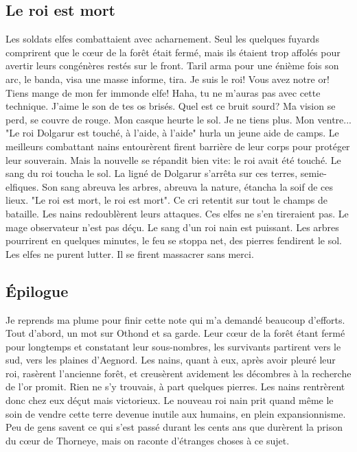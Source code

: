\subsection{Le roi est mort}
Les soldats elfes combattaient avec acharnement. Seul les quelques fuyards comprirent que le cœur de la forêt était fermé, mais ils étaient trop affolés pour avertir leurs congénères restés sur le front.
\newline
Taril arma pour une énième fois son arc, le banda, visa une masse informe, tira.
\newline
Je suis le roi! Vous avez notre or! Tiens mange de mon fer immonde elfe! Haha, tu ne m'auras pas avec cette technique. J'aime le son de tes os brisés. Quel est ce bruit sourd? Ma vision se perd, se couvre de rouge. Mon casque heurte le sol. Je ne tiens plus. Mon ventre...
\newline
"Le roi Dolgarur est touché, à l'aide, à l'aide" hurla un jeune aide de camps. Le meilleurs combattant nains entourèrent firent barrière de leur corps pour protéger leur souverain. Mais la nouvelle se répandit bien vite: le roi avait été touché.
\newline
Le sang du roi toucha le sol. La ligné de Dolgarur s'arrêta sur ces terres, semie-elfiques. Son sang abreuva les arbres, abreuva la nature, étancha la soif de ces lieux. 
\newline
"Le roi est mort, le roi est mort". Ce cri retentit sur tout le champs de bataille. Les nains redoublèrent leurs attaques. Ces elfes ne s'en tireraient pas.
\newline
Le mage observateur n'est pas déçu. Le sang d'un roi nain est puissant. Les arbres pourrirent en quelques minutes, le feu se stoppa net, des pierres fendirent le sol. Les elfes ne purent lutter. Il se firent massacrer sans merci.

\subsection{Épilogue}
Je reprends ma plume pour finir cette note qui m'a demandé beaucoup d'efforts. Tout d'abord, un mot sur Othond et sa garde. Leur cœur de la forêt étant fermé pour longtemps et constatant leur sous-nombres, les survivants partirent vers le sud, vers les plaines d'Aegnord.
\newline
Les nains, quant à eux, après avoir pleuré leur roi, rasèrent l'ancienne forêt, et creusèrent avidement les décombres à la recherche de l'or promit. Rien ne s'y trouvais, à part quelques pierres. Les nains rentrèrent donc chez eux déçut mais victorieux. Le nouveau roi nain prit quand même le soin de vendre cette terre devenue inutile aux humains, en plein expansionnisme.
\newline
Peu de gens savent ce qui s'est passé durant les cents ans que durèrent la prison du cœur de Thorneye, mais on raconte d'étranges choses à ce sujet. 